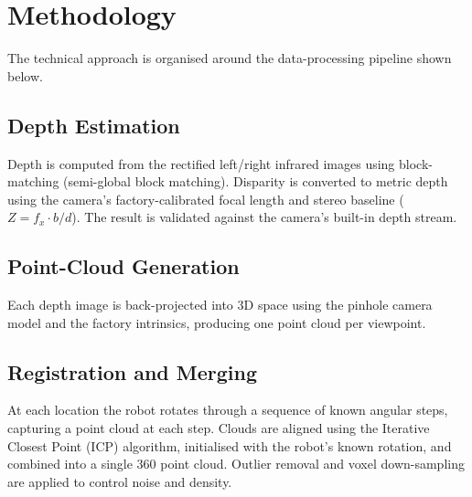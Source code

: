 \documentclass[11pt,a4paper]{article}
\begin{document}
\section{Methodology}
The technical approach is organised around the data-processing pipeline shown below.

\begin{center}
\end{center}

\subsection{Depth Estimation}
Depth is computed from the rectified left/right infrared images using block-matching (semi-global
block matching). Disparity is converted to metric depth using the camera's factory-calibrated focal
length and stereo baseline ($Z = f_x \cdot b / d$). The result is validated against the camera's
built-in depth stream.

\subsection{Point-Cloud Generation}
Each depth image is back-projected into 3D space using the pinhole camera model and the factory
intrinsics, producing one point cloud per viewpoint.

\subsection{Registration and Merging}
At each location the robot rotates through a sequence of known angular steps, capturing a point cloud
at each step. Clouds are aligned using the Iterative Closest Point (ICP) algorithm, initialised with
the robot's known rotation, and combined into a single 360\textdegree{} point cloud. Outlier removal
and voxel down-sampling are applied to control noise and density.
\end{document}
